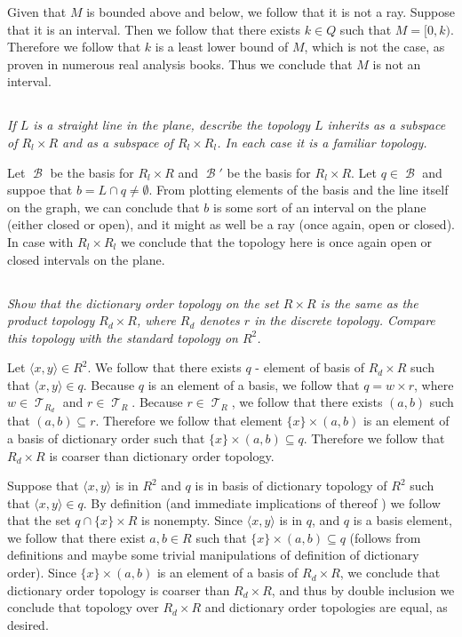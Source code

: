 \documentclass[11pt,oneside,titlepage]{book}
\DeclareMathOperator \topol {\mathcal {T}}
\DeclareMathOperator \basis {\mathcal {B}}
\newcommand{\eangle}[1]{\langle #1 \rangle}
\newcommand{\set}[1]{\{ #1 \}}
\begin{document}
Given that $M$ is bounded above and below, we follow that it is not a ray. Suppose that
it is an interval. Then we follow that there exists $k \in Q$ such that $M = [0, k)$. Therefore
we follow that $k$ is a least lower bound of $M$, which is not the case, as proven in numerous
real analysis books. Thus we conclude that $M$ is not an interval.

\subsection{}

\textit{If $L$ is a straight line in the plane, describe the topology $L$ inherits as
  a subspace of $R_l \times R$ and as a subspace of $R_l \times R_l$. In each case it is a
  familiar topology.}

Let $\basis$ be the basis for $R_l \times R$ and $\basis'$ be the basis for $R_l \times R$.
Let $q \in \basis$  and suppoe that $b = L \cap q \neq \emptyset$. From plotting elements
of the basis and the line itself on the graph, we can conclude that $b$ is some sort of an interval
on the plane (either closed or open), and it might as well be a ray (once again, open or closed).
In case with $R_l \times R_l$ we conclude that the topology here is once again open or closed
intervals on the plane.

\subsection{}

\textit{Show that the dictionary order topology on the set $R \times R$ is the same
  as the product topology $R_d \times R$, where $R_d$ denotes $r$ in the discrete topology.
  Compare this topology with the standard topology on $R^2$.}

Let $\eangle{x, y} \in R^2$. We follow that there exists $q$ - element of basis of $R_d \times R$
such that $\eangle{x, y} \in q$. Because $q$ is an element of a basis, we follow that
$q = w \times r$, where $w \in \topol_{R_d}$ and $r \in \topol_R$. Because $r \in \topol_R$,
we follow that there exists $(a, b)$ such that $(a, b) \subseteq r$. Therefore we follow that
element $\set{x} \times (a, b)$ is an element of a basis of dictionary order such that
$\set{x} \times (a, b) \subseteq q$. Therefore we follow that $R_d \times R$ is
coarser than dictionary order topology.

Suppose that $\eangle{x, y}$ is in $R^2$ and $q$ is in basis of dictionary topology of $R^2$
such that $\eangle{x, y} \in q$. By definition (and immediate implications of thereof )
we follow that the set $q \cap \set{x} \times R$ is nonempty. Since $\eangle{x, y}$
is in $q$, and $q$ is a basis element, we follow
that there exist $a, b \in R$ such that $\set{x} \times (a, b) \subseteq q$ (follows from
definitions and maybe some trivial manipulations of definition of dictionary order). Since
$\set{x} \times (a, b)$ is an element of a basis of $R_d \times R$, we conclude that
dictionary order topology is coarser than $R_d \times R$, and thus by double inclusion
we conclude that topology over $R_d \times R$ and dictionary order topologies
are equal, as desired.
\end{document}

